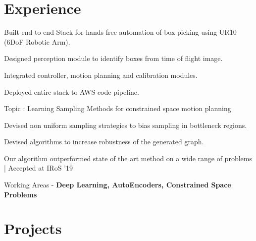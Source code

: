\documentclass[]{deedy-resume-openfont}
\begin{document}
\hfill
\begin{minipage}[t]{0.66\textwidth} 



\renewcommand\refname{PUBLICATIONS}
\nocite{*}




\section{Experience}
\begin{tightemize}
\item Built end to end Stack for hands free automation of box picking using UR10 (6DoF Robotic Arm).
\item Designed perception module to identify boxes from time of flight image. 
\item Integrated controller, motion planning and calibration modules.
\item Deployed entire stack to AWS code pipeline.
\end{tightemize}
\sectionsep

Topic : Learning Sampling Methods for constrained space motion planning
\begin{tightemize}
\item Devised non uniform sampling strategies to bias sampling in bottleneck regions.
\item Devised algorithms to increase robustness of the generated graph.
\item Our algorithm outperformed state of the art method on a wide range of problems | Accepted at IRoS '19
\end{tightemize}
Working Areas - \textbf{Deep Learning, AutoEncoders, Constrained Space Problems}
\sectionsep


\section{Projects}


\end{minipage}
\end{document}
